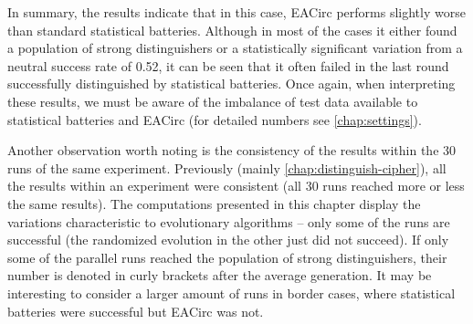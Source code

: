 \documentclass[12pt,twoside]{fithesis2}		%
\renewcommand{\_}{\leavevmode \kern0.0em\vbox{\hrule width0.4em}}
\begin{document}
In summary, the results indicate that in this case, EACirc performs slightly worse than standard statistical batteries.
Although in most of the cases it either found a population of strong distinguishers or a statistically significant variation
from a neutral success rate of 0.52, it can be seen that it often failed in the last round successfully distinguished
by statistical batteries. Once again, when interpreting these results, we must be aware of the imbalance of test data
available to statistical batteries and EACirc (for detailed numbers see \autoref{chap:settings}).

Another observation worth noting is the consistency of the results within the 30 runs of the same experiment.
Previously (mainly \autoref{chap:distinguish-cipher}), all the results within an experiment were consistent 
(all 30 runs reached more or less the same results).
The computations presented in this chapter display the variations characteristic to evolutionary algorithms -- 
only some of the runs are successful (the randomized evolution in the other just did not succeed).
If only some of the parallel runs reached the population of strong distinguishers, their number is denoted in curly brackets
after the average generation.
It may be interesting to consider a larger amount of runs in border cases, where statistical batteries were successful
but EACirc was not.
\vfill
\end{document}
